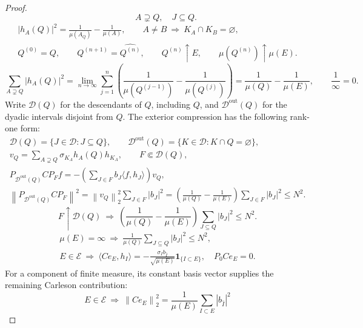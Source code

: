 \documentclass[11pt]{amsart}
\newcommand{\D}{\mathcal D}
\newcommand{\ip}[2]{\langle #1,#2\rangle}
\newcommand{\norm}[1]{\left\|#1\right\|}
\newcommand{\fin}{\Subset}
\begin{document}
\begin{proof}
\begin{equation}
                 \qquad A\supsetneq Q,\quad J\subseteq Q.
\end{equation}
\begin{gather*}
 |h_A(Q)|^2=\frac1{\mu(A_Q)}-\frac1{\mu(A)},\qquad
 A\ne B\ \Longrightarrow\ K_A\cap K_B=\varnothing,\\
 Q^{(0)}=Q,\qquad Q^{(n+1)}=\widehat{Q^{(n)}},\qquad
 Q^{(n)}\uparrow E,\qquad \mu(Q^{(n)})\uparrow\mu(E).
\end{gather*}
\begin{equation}\label{telescoping-exterior}
 \sum_{A\supsetneq Q}|h_A(Q)|^2
  =\lim_{n\to\infty}\sum_{j=1}^n
       \left(\frac1{\mu(Q^{(j-1)})}-\frac1{\mu(Q^{(j)})}\right)
  =\frac1{\mu(Q)}-\frac1{\mu(E)},\qquad \frac1\infty=0.
\end{equation}
Write $\D(Q)$ for the descendants of $Q$, including $Q$, and
$\D^{\mathrm{out}}(Q)$ for the dyadic intervals disjoint from $Q$.
The exterior compression has the following rank-one form:
\begin{gather*}
 \D(Q)=\{J\in\D:J\subseteq Q\},\qquad
 \D^{\mathrm{out}}(Q)=\{K\in\D:K\cap Q=\varnothing\},\\
 v_Q=\sum_{A\supsetneq Q}\sigma_{K_A}h_A(Q)h_{K_A},\qquad
 F\fin\D(Q),\\
 P_{\D^{\mathrm{out}}(Q)}CP_Ff
          =-\left(\sum_{J\in F}b_J\ip{f}{h_J}\right)v_Q,\\
 \norm{P_{\D^{\mathrm{out}}(Q)}CP_F}^{2}
   =\norm{v_Q}_2^2\sum_{J\in F}|b_J|^2
   =\left(\frac1{\mu(Q)}-\frac1{\mu(E)}\right)
                          \sum_{J\in F}|b_J|^2\le N^2.
\end{gather*}
\begin{equation}\label{exterior-carleson}
 F\uparrow\D(Q)\ \Longrightarrow\
 \left(\frac1{\mu(Q)}-\frac1{\mu(E)}\right)
                   \sum_{J\subseteq Q}|b_J|^2\le N^2.
\end{equation}
\begin{gather*}
 \mu(E)=\infty\ \Longrightarrow\
 \frac1{\mu(Q)}\sum_{J\subseteq Q}|b_J|^2\le N^2,\\
 E\in\mathscr E\ \Longrightarrow\
 \ip{Ce_E}{h_I}
    =-\frac{\sigma_I b_{\widehat I}}{\sqrt{\mu(E)}}
                                    \mathbf1_{\{I\subset E\}},\quad
 P_0Ce_E=0.
\end{gather*}
For a component of finite measure, its constant basis vector supplies
the remaining Carleson contribution:
\begin{equation}\label{finite-component-column}
 E\in\mathscr E\ \Longrightarrow\
 \norm{Ce_E}_2^2
  =\frac1{\mu(E)}\sum_{I\subset E}|b_{\widehat I}|^2

\end{equation}
\end{proof}
\end{document}
